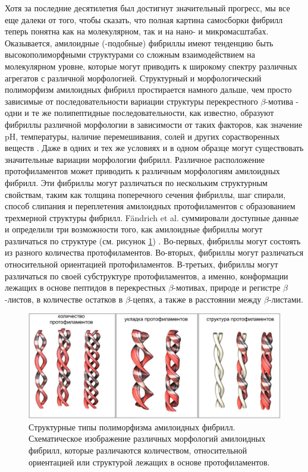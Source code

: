     Хотя за последние десятилетия был достигнут значительный прогресс, мы все еще далеки от того, чтобы сказать, что полная картина самосборки фибрилл теперь понятна как на молекулярном, так и на нано- и микромасштабах. Оказывается, амилоидные (-подобные) фибриллы имеют тенденцию быть высокополиморфными структурами \cite{fandrich_structural_2009} со сложным взаимодействием на молекулярном уровне, которые могут приводить к широкому спектру различных агрегатов с различной морфологией. Структурный и морфологический полиморфизм амилоидных фибрилл простирается намного дальше, чем просто зависимые от последовательности вариации структуры перекрестного $\beta$-мотива - одни и те же полипептидные последовательности, как известно, образуют фибриллы различной морфологии в зависимости от таких факторов, как значение pH, температуры, наличие перемешивания, солей и других сорастворенных веществ \cite{petkova_self-propagating_2005,pedersen_changing_2006,toyama_structural_2007,makarava_same_2008,verel_polymorphism_2008,klement_effect_2007}. Даже в одних и тех же условиях и в одном образце могут существовать значительные вариации морфологии фибрилл. Различное расположение протофиламентов может приводить к различным морфологиям амилоидных фибрилл. Эти фибриллы могут различаться по нескольким структурным свойствам, таким как толщина поперечного сечения фибриллы, шаг спирали, способ слипания и переплетения амилоидных протофиламентов с образованием трехмерной структуры фибрилл. Fändrich et al. суммировали доступные данные и определили три возможности того, как амилоидные фибриллы могут различаться по структуре (см. рисунок \ref{fig:p4_p1_f4}) \cite{fandrich_structural_2009}. Во-первых, фибриллы могут состоять из разного количества протофиламентов. Во-вторых, фибриллы могут различаться относительной ориентацией протофиламентов. В-третьих, фибриллы могут различаться по своей субструктуре протофиламентов, а именно, конформации лежащих в основе пептидов в перекрестных $\beta$-мотивах, природе и регистре $\beta$-листов, в количестве остатков в $\beta$-цепях, а также в расстоянии между $\beta$-листами.

\begin{figure} [H]
    \centering
    \includegraphics[width=\textwidth]{images/p4/punkt1/part4_p1_f4.pdf}
    \caption[Структурные типы полиморфизма амилоидных фибрилл]{Структурные типы полиморфизма амилоидных фибрилл. Схематическое изображение различных морфологий амилоидных фибрилл, которые различаются количеством, относительной ориентацией или структурой лежащих в основе протофиламентов.}
    \label{fig:p4_p1_f4}
\end{figure}



